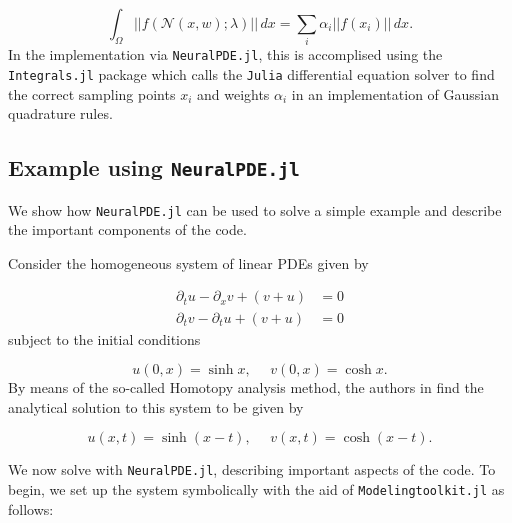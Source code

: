 \documentclass{CUP-JNL-DTM}%
\theoremstyle{definition}
\numberwithin{equation}{section}
\newcommand{\Julia}{\texttt{Julia} }
\newcommand{\net}{\mathcal{N}}
\begin{document}
\begin{equation}
	\int_{\Omega} ||f(\net(x,w); \lambda)||\,dx = \sum_i \alpha_i ||f(x_i)||\,dx.
\end{equation}
In the implementation via \texttt{NeuralPDE.jl}, this is accomplised using the \texttt{Integrals.jl} package which calls the \Julia differential equation solver \cite{rackauckasDifferentialEquationsJlPerformant2017} to find the correct sampling points $x_i$ and weights $\alpha_i$ in an implementation of Gaussian quadrature rules. 

\subsection{Example using \texttt{NeuralPDE.jl}}

We show how \texttt{NeuralPDE.jl} can be used to solve a simple example and describe the important components of the code. 

Consider the homogeneous system of linear PDEs given by

\begin{equation}
\begin{split}
	\partial_t u - \partial_x v + (v + u) & = 0 \\
	\partial_t v - \partial_t u + (v + u) & = 0
\end{split}
\end{equation}
subject to the initial conditions 

\begin{equation}
	u(0,x) = \sinh x, \,\,\,\,\,\,\,\, v(0,x) = \cosh x. 
\end{equation}    
By means of the so-called Homotopy analysis method, the authors in \cite{samibatainehApproximateAnalyticalSolutions2008} find the analytical solution to this system to be given by 

\begin{equation}
	u(x,t) = \sinh(x - t), \,\,\,\,\,\,\,\, v(x,t) = \cosh(x - t). 
\end{equation}

We now solve with \texttt{NeuralPDE.jl}, describing important aspects of the code. To begin, we set up the system symbolically with the aid of \texttt{Modelingtoolkit.jl} as follows:
\end{document}
